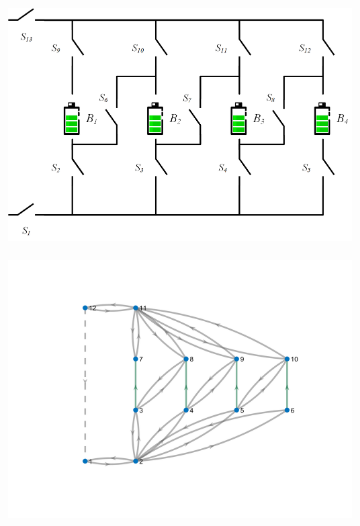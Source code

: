 \documentclass{article}
\begin{document}
\begin{figure}[htbp]
    \centering
    \begin{subfigure}[b]{0.45\textwidth}
        \includegraphics[width=\textwidth]{../attachments/f4-phy.png}
        \caption{}
        \label{fig:f4-phy}
    \end{subfigure}
    \hspace{0.05\textwidth}
    \begin{subfigure}[b]{0.45\textwidth}
        \includegraphics[width=\textwidth]{../attachments/f4-gra.png}
        \caption{}
        \label{fig:f4-gra}
    \end{subfigure}
    \\
    \begin{subfigure}[b]{0.45\textwidth}

\end{subfigure}
\end{figure}
\end{document}
